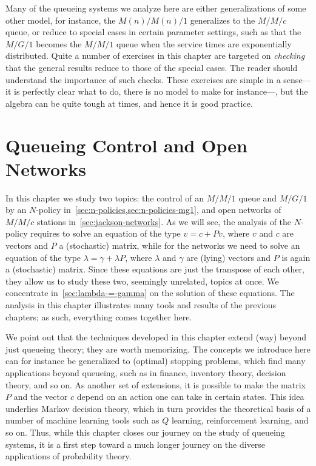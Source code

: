 Many of the queueing systems we analyze here are either generalizations of some other model, for instance, the $M(n)/M(n)/1$ generalizes to the $M/M/c$ queue, or reduce to special cases in certain parameter settings, such as that the $M/G/1$ becomes the $M/M/1$ queue when the service times are exponentially distributed.
Quite a number of exercises in this chapter are targeted on \emph{checking} that the general results reduce to those of the special cases.
The reader should understand the importance of such checks.
These exercises are simple in a sense---it is perfectly clear what to do, there is no model to make for instance---, but the algebra can be quite tough at times, and hence it is good practice.









\chapter{Queueing Control and Open Networks}
\label{cha:queu-contr-open}

In this chapter we study two topics: the control of an $M/M/1$ queue and $M/G/1$ by an $N$-policy in~\cref{sec:n-policies,sec:n-policies-mg1}, and open networks of $M/M/c$ stations in~\cref{sec:jackson-networks}.
As we will see, the analysis of the $N$-policy requires to solve an equation of the type $v = c + P v$, where $v$ and $c$ are vectors and $P$ a (stochastic) matrix, while for the networks we need to solve an equation of the type $\lambda = \gamma + \lambda P$, where $\lambda$ and $\gamma$ are (lying) vectors and $P$ is again a (stochastic) matrix.
Since these equations are just the transpose of each other, they allow us to study these two, seemingly unrelated, topics at once.
We concentrate in~\cref{sec:lambda-=-gamma} on the solution of these equations.
The analysis in this chapter illustrates many tools and results of the previous chapters; as such, everything comes together here.

We point out that the techniques developed in this chapter extend (way) beyond just queueing theory; they are worth memorizing.
The concepts we introduce here can for instance be generalized to (optimal) stopping problems, which find many applications beyond queueing, such as in finance, inventory theory, decision theory, and so on.
As another set of extensions, it is possible to make the matrix $P$ and the vector $c$ depend on an action one can take in certain states.
This idea underlies Markov decision theory, which in turn provides the theoretical basis of a number of machine learning tools such as $Q$ learning, reinforcement learning, and so on.
Thus, while this chapter closes our journey on the study of queueing systems, it is a first step toward a much longer journey on the diverse applications of probability theory.



